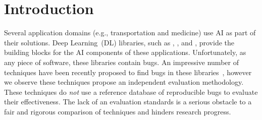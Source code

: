 \documentclass[sigconf,screen]{acmart}
\begin{document}



\maketitle
\pagestyle{plain}


\section{Introduction}

\sloppy Several application domains (e.g., transportation and
medicine) use AI as part of their solutions. Deep Learning~(DL)
libraries, such as \jax, \torch{}, and \tf{}, provide the building
blocks for the AI components of these applications.  Unfortunately, as
any piece of software, these libraries contain bugs. An impressive
number of techniques have been recently proposed to find bugs in these
libraries~\cite{wei2022free,xie2022docter,deng2022fuzzing,pham2019cradle,guo2020audee,wang2020deep,gu2022muffin,deng2023large,liu2023nnsmith,liu2023neuri,shi2023acetest,deng2023largeedge},
however we observe these techniques propose an independent evaluation
methodology. These techniques do \emph{not} use a reference database
of reproducible bugs to evaluate their effectiveness. The lack of an
evaluation standards is a serious obstacle to a fair and rigorous
comparison of techniques and hinders research progress.
\end{document}
